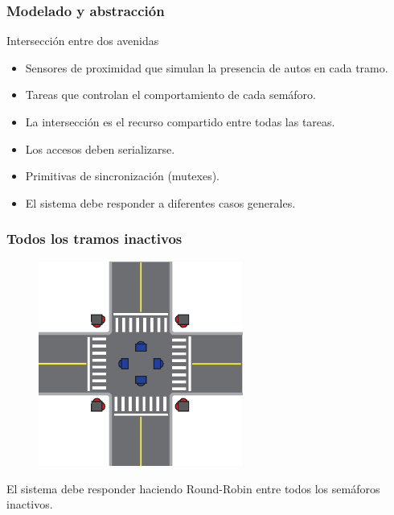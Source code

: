 \begin{frame}
\frametitle{Modelado y abstracción}
\begin{block}{Intersección entre dos avenidas}
	\begin{itemize}
		\item Sensores de proximidad que simulan la presencia de autos en cada tramo.
		\item Tareas que controlan el comportamiento de cada semáforo.
		\item La intersección es el recurso compartido entre todas las tareas.
		\item Los accesos deben serializarse.
		\item Primitivas de sincronización (mutexes).
		\item El sistema debe responder a diferentes casos generales.
	\end{itemize}
\end{block}
\end{frame}

\begin{frame}
\frametitle{Todos los tramos inactivos}
	\begin{figure}[htbp]
		\centering
		\includegraphics[width=0.60\textwidth]{diagramas/ningun-activo.eps}
	\end{figure}
	El sistema debe responder haciendo Round-Robin entre todos los semáforos inactivos.
\end{frame}


